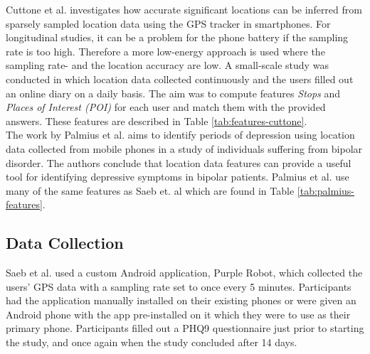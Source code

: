 


Cuttone et al. \cite{sparse-location-2014} investigates how accurate significant locations can be inferred from sparsely sampled location data using the GPS tracker in smartphones. For longitudinal studies, it can be a problem for the phone battery if the sampling rate is too high. Therefore a more low-energy approach is used where the sampling rate- and the location accuracy are low. A small-scale study was conducted in which location data collected continuously and the users filled out an online diary on a daily basis. The aim was to compute features \textit{Stops} and \textit{Places of Interest (POI)} for each user and match them with the provided answers. These features are described in Table \ref{tab:features-cuttone}. \\



The work by Palmius et al. \cite{palmius2017} aims to identify periods of depression using location data collected from mobile phones in a study of individuals suffering from bipolar disorder. The authors conclude that location data features can provide a useful tool for identifying depressive symptoms in bipolar patients. Palmius et al. use many of the same features as Saeb et. al \cite{Saeb2015, saeb2016} which are found in Table \ref{tab:palmius-features}.



\subsection{Data Collection}
Saeb et al. used a custom Android application, Purple Robot, which collected the users' GPS data with a sampling rate set to once every 5 minutes. Participants had the application manually installed on their existing phones or were given an Android phone with the app pre-installed on it which they were to use as their primary phone. Participants filled out a PHQ9 questionnaire just prior to starting the study, and once again when the study concluded after 14 days.\\


